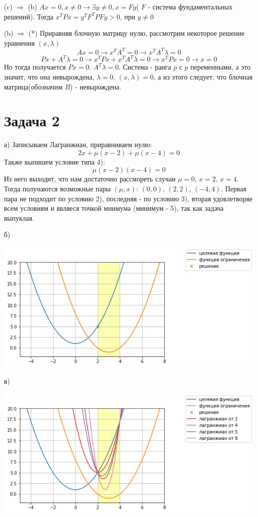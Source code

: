 \documentclass{article}
\begin{document}
(c)  $\Longrightarrow$ (b) $Ax = 0, x \neq 0 \longrightarrow \exists y \neq 0, x = Fy$( $F$ - система фундаментальных решений). Тогда $x^TPx = y^TF^TPFy > 0$, при $y \neq 0$

(b) $\Longrightarrow$ (*)
Приравняв блочную матрицу нулю, рассмотрим некоторое решение уравнения $(x, \lambda)$
$$ Ax = 0 \longrightarrow x^TA^T = 0 \longrightarrow x^TA^T\lambda = 0$$
$$ Px + A^T \lambda = 0 \longrightarrow x^TPx + x^TA^T \lambda = 0 \longrightarrow x^TPx = 0 \longrightarrow x = 0$$
Но тогда получается $Px = 0$. $A^T \lambda = 0$. Система - ранга $p$ с $p$ переменными, а это значит, что она невырождена, $\lambda = 0$. $(x, \lambda ) = 0$, а из этого следует, что блочная матрица(обозначим $B$) - невырождена.

\section{Задача 2}
а) Записываем Лагранжиан, приравниваем нулю:
$$ 2x + \mu(x - 2) + \mu(x - 4) = 0$$
Также выпишем условие типа 4):
$$ \mu(x - 2)(x - 4) = 0$$
Из него выходит, что нам достаточно рассмореть случаи $\mu = 0$, $x = 2$, $x = 4$. Тогда получаются возможные пары $(\mu, x)$: $(0, 0)$, $(2, 2)$, $(-4, 4)$. Первая пара не подходит по условию 2), последняя - по условию 3), вторая удовлетворяе всем условиям и являеся точкой мнимума (минимум - 5), так как задача выпуклая. 

б)

\includegraphics[scale=0.7]{pic1.jpg}

в)

\includegraphics[scale=0.7]{pic2.png}
\end{document}
